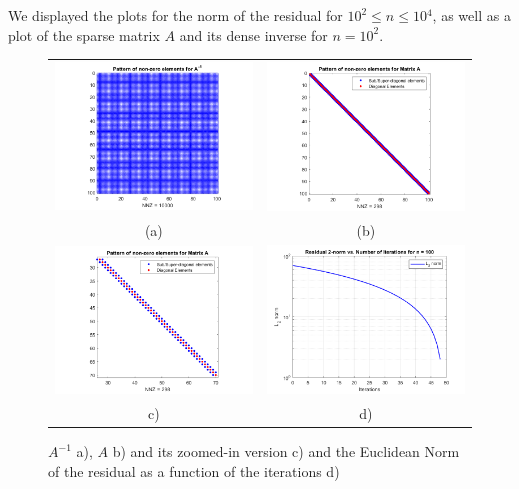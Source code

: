 \documentclass[a4paper,11pt]{article}
\begin{document}
We displayed the plots for the norm of the residual for $10^{2}\leq{n}\leq{10{^4}}$, as well as a plot of the sparse matrix $A$ and its dense inverse for $n=10^{2}$.

\begin{figure}[!ht]
	\centering
	\begin{tabular}{cc}
		\includegraphics[width=.55\textwidth]{CG1_1e2_dense} &\hspace{-25pt} \includegraphics[width=.55\textwidth]{CG1_1e2_sparse} \\
		(a) & (b)\\
		\includegraphics[width=.55\textwidth]{CG1_1e2_sparse_zoom} &\hspace{-25pt} \includegraphics[width=.55\textwidth]{CG1_1e2_norm} \\
		c) & d)\\
	\end{tabular}
	\caption{$A^{-1}$ a), $A$ b) and its zoomed-in version c) and the Euclidean Norm of the residual as a function of the iterations d)}
	\label{}
\end{figure}
\end{document}
